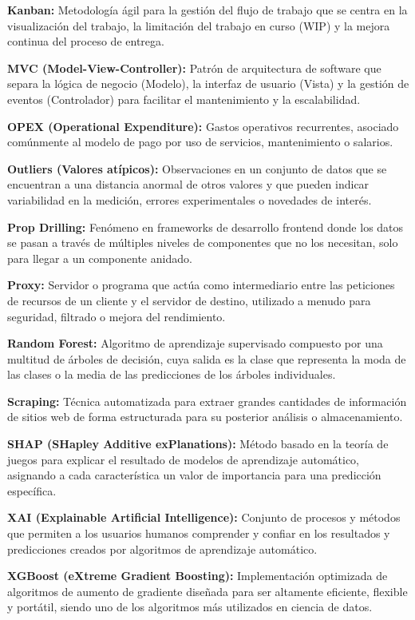 \textbf{Kanban:} 
Metodología ágil para la gestión del flujo de trabajo que se centra en la visualización del trabajo, la limitación del trabajo en curso (WIP) y la mejora continua del proceso de entrega.

\textbf{MVC (Model-View-Controller):} 
Patrón de arquitectura de software que separa la lógica de negocio (Modelo), la interfaz de usuario (Vista) y la gestión de eventos (Controlador) para facilitar el mantenimiento y la escalabilidad.

\textbf{OPEX (Operational Expenditure):} 
Gastos operativos recurrentes, asociado comúnmente al modelo de pago por uso de servicios, mantenimiento o salarios.

\textbf{Outliers (Valores atípicos):} 
Observaciones en un conjunto de datos que se encuentran a una distancia anormal de otros valores y que pueden indicar variabilidad en la medición, errores experimentales o novedades de interés.

\textbf{Prop Drilling:} 
Fenómeno en frameworks de desarrollo frontend donde los datos se pasan a través de múltiples niveles de componentes que no los necesitan, solo para llegar a un componente anidado.

\textbf{Proxy:} 
Servidor o programa que actúa como intermediario entre las peticiones de recursos de un cliente y el servidor de destino, utilizado a menudo para seguridad, filtrado o mejora del rendimiento.

\textbf{Random Forest:} 
Algoritmo de aprendizaje supervisado compuesto por una multitud de árboles de decisión, cuya salida es la clase que representa la moda de las clases o la media de las predicciones de los árboles individuales.

\textbf{Scraping:} 
Técnica automatizada para extraer grandes cantidades de información de sitios web de forma estructurada para su posterior análisis o almacenamiento.

\textbf{SHAP (SHapley Additive exPlanations):} 
Método basado en la teoría de juegos para explicar el resultado de modelos de aprendizaje automático, asignando a cada característica un valor de importancia para una predicción específica.

\textbf{XAI (Explainable Artificial Intelligence):} 
Conjunto de procesos y métodos que permiten a los usuarios humanos comprender y confiar en los resultados y predicciones creados por algoritmos de aprendizaje automático.

\textbf{XGBoost (eXtreme Gradient Boosting):} 
Implementación optimizada de algoritmos de aumento de gradiente diseñada para ser altamente eficiente, flexible y portátil, siendo uno de los algoritmos más utilizados en ciencia de datos.